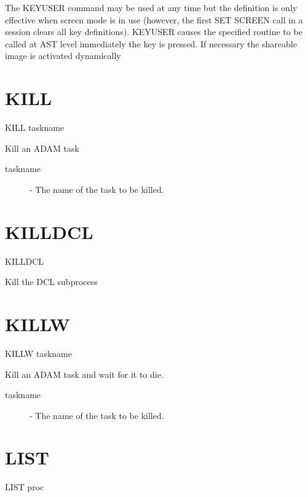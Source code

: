 \documentclass[twoside,11pt,nolof,chapters]{starlink}
\begin{document}
The KEYUSER command may be used at any time but the definition is only
effective when screen mode is in use (however, the first SET SCREEN call
in a session clears all key definitions). KEYUSER causes the specified routine
to be called at AST level immediately the key is pressed. If necessary the
shareable image is activated dynamically

\section{KILL\label{KILL}}

    KILL \hspace{.5cm} taskname

 Kill an ADAM task

\begin{description}

\item[taskname] -  The name of the task to be killed.

\end{description}

\section{KILLDCL\label{KILLDCL}}

    KILLDCL

 Kill the DCL subprocess

\section{KILLW\label{KILLW}}

    KILLW \hspace{.5cm} taskname

 Kill an ADAM task and wait for it to die.

\begin{description}

\item[taskname] -  The name of the task to be killed.

\end{description}

\section{LIST\label{LIST}}

    LIST \hspace{.5cm} proc
\end{document}
